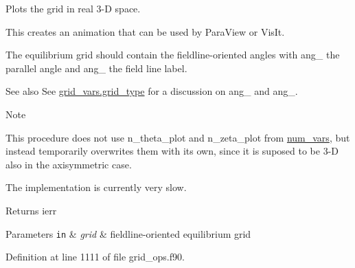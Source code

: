 Plots the grid in real 3-\/D space. 

This creates an animation that can be used by Para\+View or Vis\+It.

The equilibrium grid should contain the fieldline-\/oriented angles with {\ttfamily ang\+\_} the parallel angle and {\ttfamily ang\+\_} the field line label.

\begin{DoxySeeAlso}{See also}
See \hyperlink{structgrid__vars_1_1grid__type}{grid\+\_\+vars.\+grid\+\_\+type} for a discussion on {\ttfamily ang\+\_} and {\ttfamily ang\+\_}.
\end{DoxySeeAlso}
\begin{DoxyNote}{Note}

\begin{DoxyEnumerate}
\item This procedure does not use {\ttfamily n\+\_\+theta\+\_\+plot} and {\ttfamily n\+\_\+zeta\+\_\+plot} from \hyperlink{namespacenum__vars}{num\+\_\+vars}, but instead temporarily overwrites them with its own, since it is suposed to be 3-\/D also in the axisymmetric case.
\item The implementation is currently very slow.
\end{DoxyEnumerate}
\end{DoxyNote}
\begin{DoxyReturn}{Returns}
ierr
\end{DoxyReturn}

\begin{DoxyParams}[1]{Parameters}
\mbox{\tt in}  & {\em grid} & fieldline-\/oriented equilibrium grid \\
\hline
\end{DoxyParams}


Definition at line 1111 of file grid\+\_\+ops.\+f90.

